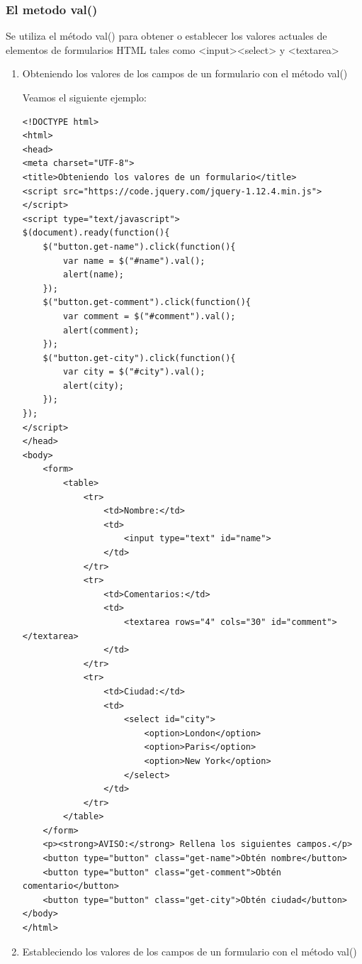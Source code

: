 \documentclass[a4paper, oneside]{article}
\begin{document}
\subsubsection{El metodo val()}
\label{sec:orgbca2319}

Se utiliza el método val() para obtener o establecer los valores actuales de elementos de formularios HTML tales como <input><select> y <textarea>

\begin{enumerate}
\item Obteniendo los valores de los campos de un formulario con el método val()
\label{sec:orgebd8a3a}

Veamos el siguiente ejemplo:

\begin{verbatim}
<!DOCTYPE html>
<html>
<head>
<meta charset="UTF-8">
<title>Obteniendo los valores de un formulario</title>
<script src="https://code.jquery.com/jquery-1.12.4.min.js"></script>
<script type="text/javascript">
$(document).ready(function(){
    $("button.get-name").click(function(){
        var name = $("#name").val();
        alert(name);
    });
    $("button.get-comment").click(function(){
        var comment = $("#comment").val();
        alert(comment);
    });
    $("button.get-city").click(function(){
        var city = $("#city").val();
        alert(city);
    });
});
</script>
</head>
<body>
    <form>
        <table>
            <tr>
                <td>Nombre:</td>
                <td>
                    <input type="text" id="name">
                </td>
            </tr>
            <tr>
                <td>Comentarios:</td>
                <td>
                    <textarea rows="4" cols="30" id="comment"></textarea>
                </td>
            </tr>
            <tr>
                <td>Ciudad:</td>
                <td>
                    <select id="city">
                        <option>London</option>
                        <option>Paris</option>
                        <option>New York</option>
                    </select>
                </td>
            </tr>
        </table>
    </form>
    <p><strong>AVISO:</strong> Rellena los siguientes campos.</p>
    <button type="button" class="get-name">Obtén nombre</button>
    <button type="button" class="get-comment">Obtén comentario</button>
    <button type="button" class="get-city">Obtén ciudad</button>
</body>
</html>                        
\end{verbatim}

\item Estableciendo los valores de los campos de un formulario con el método val()
\label{sec:org62bf7b0}


\end{enumerate}
\end{document}
